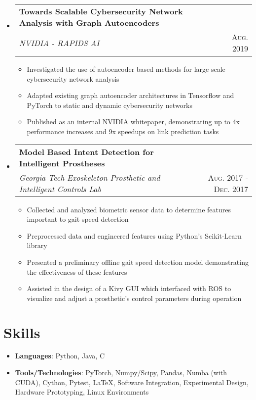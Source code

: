 \documentclass[letterpaper,11pt]{article}
\makeatletter
\newcommand{\resumeItem}[2]{
  \item\small{
    \textbf{#1}{: #2 \vspace{-1.0pt}}
  }
}
\newcommand{\resumePlainItem}[1]{
  \item\small{#1 \vspace{-1.0pt}}
}
\newcommand{\resumeSubheading}[4]{
  \vspace{-1pt}\item[]
    \begin{tabular*}{0.97\textwidth}{l@{\extracolsep{\fill}}r}
      \textbf{#1} & #2 \\
      \textit{\small#3} & \textsc{\small #4} \\ %
    \end{tabular*}\vspace{-5pt}
}
\newcommand{\resumeSubHeadingListStart}{\begin{itemize}[leftmargin=*]}
\newcommand{\resumeSubHeadingListEnd}{\end{itemize}}
\newcommand{\resumeItemListStart}{\begin{itemize}}
\newcommand{\resumeItemListEnd}{\end{itemize}\vspace{-5pt}}
\newenvironment{resumeItemList}{\resumeItemListStart}{\resumeItemListEnd}
\newenvironment{resumeSubheadingList}{\resumeSubHeadingListStart}{\resumeSubHeadingListEnd}
\makeatother
\begin{document}
\begin{resumeSubheadingList}
\begin{resumeItemList}
    \end{resumeItemList}

    \resumeSubheading
    {Towards Scalable Cybersecurity Network Analysis with Graph Autoencoders}{}
    {NVIDIA - RAPIDS AI}{Aug. 2019}
    \begin{resumeItemList}
      \resumePlainItem{Investigated the use of autoencoder based methods for large scale cybersecurity network analysis}
      \resumePlainItem{Adapted existing graph autoencoder architectures in Tensorflow and PyTorch to static and dynamic
      cybersecurity networks}
      \resumePlainItem{Published as an internal NVIDIA whitepaper, demonstrating up to 4x performance increases and 
      9x speedups on link prediction tasks}
    \end{resumeItemList}

    \resumeSubheading
    {Model Based Intent Detection for Intelligent Prostheses}{}
    {Georgia Tech Exoskeleton Prosthetic and Intelligent Controls Lab}{Aug. 2017 - Dec. 2017}
    \begin{resumeItemList}
      \resumePlainItem{Collected and analyzed biometric sensor data to determine features important to gait
      speed detection}
      \resumePlainItem{Preprocessed data and engineered features using Python's Scikit-Learn library} %
      \resumePlainItem{Presented a preliminary offline gait speed detection model demonstrating the effectiveness of these features}
      \resumePlainItem{Assisted in the design of a Kivy GUI which interfaced with ROS to visualize and adjust a prosthetic's control
      parameters during operation}
    \end{resumeItemList}
  \end{resumeSubheadingList}
\section{Skills}
  \begin{resumeItemList}
    \resumeItem{Languages}{Python, Java, C}
    \resumeItem{Tools/Technologies}{PyTorch, Numpy/Scipy, Pandas, Numba (with CUDA), Cython, Pytest, \LaTeX,
                                    Software Integration, Experimental Design, Hardware Prototyping, Linux Environments} %
  \end{resumeItemList}
\end{document}
